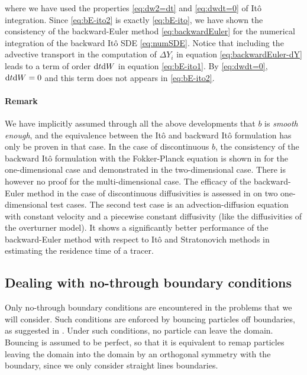 where we have used the properties \eqref{eq:dw2=dt} and \eqref{eq:dwdt=0} of Itô integration. Since \eqref{eq:bE-ito2} is exactly \eqref{eq:bE-ito}, we have shown the consistency of the backward-Euler method \eqref{eq:backwardEuler} for the numerical integration of the backward Itô SDE \eqref{eq:numSDE}. Notice that including the advective transport in the computation of $\Delta Y_i$ in equation \eqref{eq:backwardEuler-dY} leads to a term of order $\rm dt \rm dW$ in equation \eqref{eq:bE-ito1}. By \eqref{eq:dwdt=0}, $\rm dt \rm dW = 0$ and this term does not appears in \eqref{eq:bE-ito2}. 

\paragraph{Remark} We have implicitly assumed through all the above developments that $b$ is \textit{smooth enough}, and the equivalence between the Itô and backward Itô formulation has only be proven in that case. In the case of discontinuous $b$, the consistency of the backward Itô formulation with the Fokker-Planck equation is shown in \cite{labolle2000diffusion} for the one-dimensional case and demonstrated in the two-dimensional case. There is however no proof for the multi-dimensional case. The efficacy of the backward-Euler method in the case of discontinuous diffusivities is assessed in \cite{spivakovskaya2007backward} on two one-dimensional test cases. The second test case is an advection-diffusion equation with constant velocity and a piecewise constant diffusivity (like the diffusivities of the overturner model). It shows a significantly better performance of the backward-Euler method with respect to Itô and Stratonovich methods in estimating the residence time of a tracer. %

\subsection{Dealing with no-through boundary conditions}
Only no-through boundary conditions are encountered in the problems that we will consider. Such conditions are enforced by bouncing particles off boundaries, as suggested in \cite{tompson1992particle}. Under such conditions, no particle can leave the domain. Bouncing is assumed to be perfect, so that it is equivalent to remap particles leaving the domain into the domain by an orthogonal symmetry with the boundary, since we only consider straight lines boundaries.

